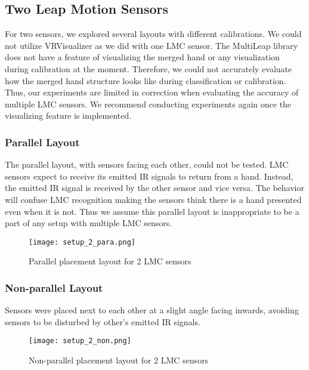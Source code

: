 \subsection{Two Leap Motion Sensors}

For two sensors, we explored several layouts with different calibrations. We could not utilize VRVisualizer as we did with one LMC sensor. The MultiLeap library does not have a feature of visualizing the merged hand or any visualization during calibration at the moment. Therefore, we could not accurately evaluate how the merged hand structure looks like during classification or calibration. Thus, our experiments are limited in correction when evaluating the accuracy of multiple LMC sensors. We recommend conducting experiments again once the visualizing feature is implemented.

\subsubsection{Parallel Layout}
\label{parallel_layout}

The parallel layout, with sensors facing each other, could not be tested. LMC sensors expect to receive its emitted IR signals to return from a hand. Instead, the emitted IR signal is received by the other sensor and vice versa. The behavior will confuse LMC recognition making the sensors think there is a hand presented even when it is not. Thus we assume this parallel layout is inappropriate to be a part of any setup with multiple LMC sensors.

\begin{figure}[H]
    \centering
    \texttt{[image: setup\_2\_para.png]}
    \caption{Parallel placement layout for 2 LMC sensors}
    \label{fig:setup_2_para}
\end{figure}

\subsubsection{Non-parallel Layout}

Sensors were placed next to each other at a slight angle facing inwards, avoiding sensors to be disturbed by other's emitted IR signals.

\begin{figure}[ht]
    \centering
    \texttt{[image: setup\_2\_non.png]}
    \caption{Non-parallel placement layout for 2 LMC sensors}
    \label{fig:setup_2_non}
\end{figure}

